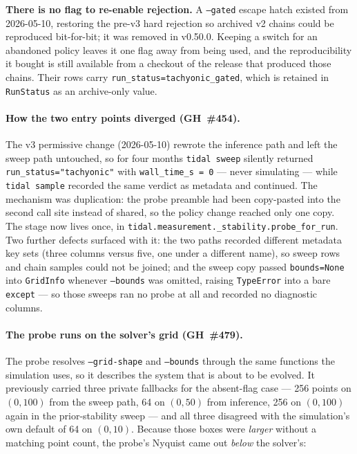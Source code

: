 \textbf{There is no flag to re-enable rejection.}  A \texttt{--gated}
escape hatch existed from 2026-05-10, restoring the pre-v3 hard
rejection so archived v2 chains could be reproduced bit-for-bit; it was
removed in v0.50.0.  Keeping a switch for an abandoned policy leaves it
one flag away from being used, and the reproducibility it bought is
still available from a checkout of the release that produced those
chains.  Their rows carry \texttt{run\_status=tachyonic\_gated}, which
is retained in \texttt{RunStatus} as an archive-only value.

\paragraph{How the two entry points diverged (GH~\#454).}  The v3
permissive change (2026-05-10) rewrote the inference path and left the
sweep path untouched, so for four months \texttt{tidal sweep} silently
returned \texttt{run\_status="tachyonic"} with \texttt{wall\_time\_s
= 0} --- never simulating --- while \texttt{tidal sample} recorded the
same verdict as metadata and continued.  The mechanism was duplication:
the probe preamble had been copy-pasted into the second call site
instead of shared, so the policy change reached only one copy.  The
stage now lives once, in
\texttt{tidal.measurement.\_stability.probe\_for\_run}.  Two further
defects surfaced with it: the two paths recorded different metadata key
sets (three columns versus five, one under a different name), so sweep
rows and chain samples could not be joined; and the sweep copy passed
\texttt{bounds=None} into \texttt{GridInfo} whenever \texttt{--bounds}
was omitted, raising \texttt{TypeError} into a bare \texttt{except} ---
so those sweeps ran no probe at all and recorded no diagnostic columns.

\paragraph{The probe runs on the solver's grid (GH~\#479).}  The probe
resolves \texttt{--grid-shape} and \texttt{--bounds} through the same
functions the simulation uses, so it describes the system that is about
to be evolved.  It previously carried three private fallbacks for the
absent-flag case --- 256 points on $(0,100)$ from the sweep path, 64 on
$(0,50)$ from inference, 256 on $(0,100)$ again in the prior-stability
sweep --- and all three disagreed with the simulation's own default of
64 on $(0,10)$.  Because those boxes were \emph{larger} without a
matching point count, the probe's Nyquist came out \emph{below} the
solver's:

